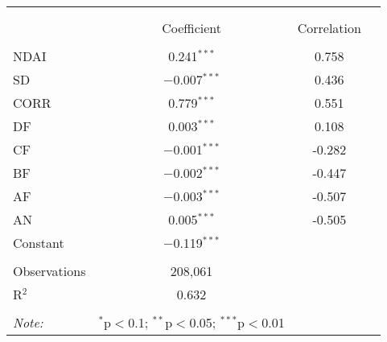\begin{tabular}{@{\extracolsep{5pt}}lccc} 
\\[-1.8ex]\hline 
\hline \\[-1.8ex]  
\\[-1.8ex] & Coefficient & Correlation \\ 
\hline \\[-1.8ex] 
 NDAI & 0.241$^{***}$ & 0.758 \\ 
 SD & $-$0.007$^{***}$ & 0.436 \\ 
 CORR & 0.779$^{***}$   &  0.551\\ 
 DF & 0.003$^{***}$ & 0.108\\ 
 CF & $-$0.001$^{***}$ & -0.282\\ 
 BF & $-$0.002$^{***}$ & -0.447\\ 
 AF & $-$0.003$^{***}$ & -0.507\\ 
 AN & 0.005$^{***}$ & -0.505\\ 
 Constant & $-$0.119$^{***}$ \\ 
\hline \\[-1.8ex] 
Observations & 208,061 \\ 
R$^{2}$ & 0.632 \\ 
\hline 
\hline \\[-1.8ex] 
\textit{Note:}  & \multicolumn{1}{r}{$^{*}$p$<$0.1; $^{**}$p$<$0.05; $^{***}$p$<$0.01} \\ 
\end{tabular} 
